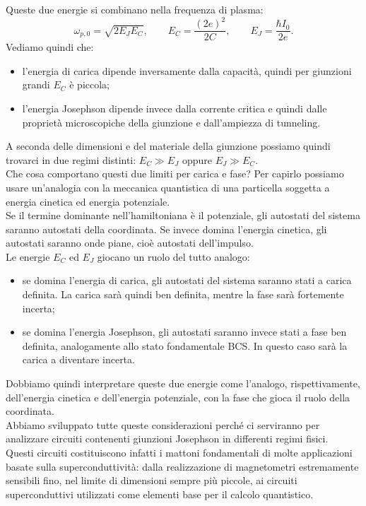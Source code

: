 Queste due energie si combinano nella frequenza di plasma:
\begin{equation*}
    \omega_{p,0}
    =
    \sqrt{2E_JE_C},
    \qquad
    E_C
    =
    \frac{(2e)^2}{2C},
    \qquad
    E_J
    =
    \frac{\hbar I_0}{2e}.
\end{equation*}
Vediamo quindi che:
\begin{itemize}[leftmargin=0.5cm]
    \item l'energia di carica dipende inversamente dalla capacità, quindi per giunzioni grandi $E_C$ è piccola;
    \item l'energia Josephson dipende invece dalla corrente critica e quindi dalle proprietà microscopiche della giunzione e dall'ampiezza di tunneling.
\end{itemize}
A seconda delle dimensioni e del materiale della giunzione possiamo quindi trovarci in due regimi distinti: $E_C \gg E_J$ oppure $E_J \gg E_C$.\\
Che cosa comportano questi due limiti per carica e fase? Per capirlo possiamo usare un'analogia con la meccanica quantistica di una particella soggetta a energia cinetica ed energia potenziale.\\
Se il termine dominante nell'hamiltoniana è il potenziale, gli autostati del sistema saranno autostati della coordinata. Se invece domina l'energia cinetica, gli autostati saranno onde piane, cioè autostati dell'impulso.\\
Le energie $E_C$ ed $E_J$ giocano un ruolo del tutto analogo:
\begin{itemize}[leftmargin=0.5cm]
    \item se domina l'energia di carica, gli autostati del sistema saranno stati a carica definita. La carica sarà quindi ben definita, mentre la fase sarà fortemente incerta;
    \item se domina l'energia Josephson, gli autostati saranno invece stati a fase ben definita, analogamente allo stato fondamentale BCS. In questo caso sarà la carica a diventare incerta.
\end{itemize}
Dobbiamo quindi interpretare queste due energie come l'analogo, rispettivamente, dell'energia cinetica e dell'energia potenziale, con la fase che gioca il ruolo della coordinata.\\
Abbiamo sviluppato tutte queste considerazioni perché ci serviranno per analizzare circuiti contenenti giunzioni Josephson in differenti regimi fisici.\\
Questi circuiti costituiscono infatti i mattoni fondamentali di molte applicazioni basate sulla superconduttività: dalla realizzazione di magnetometri estremamente sensibili fino, nel limite di dimensioni sempre più piccole, ai circuiti superconduttivi utilizzati come elementi base per il calcolo quantistico.
